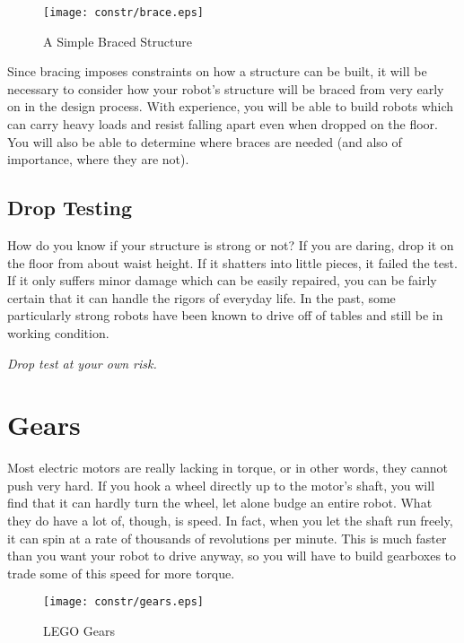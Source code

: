 \begin{figure}[htbp]
\begin{center}
\texttt{[image: constr/brace.eps]}
\caption{A Simple Braced Structure}
\label{brace}
\end{center}
\end{figure}

Since bracing imposes constraints on how a structure can be built, it
will be necessary to consider how your robot's structure will be
braced from very early on in the design process. With experience, you
will be able to build robots which can carry heavy loads and resist
falling apart even when dropped on the floor. You will also be able to
determine where braces are needed (and also of importance, where they
are not).

\subsection{Drop Testing}

How do you know if your structure is strong or not?  If you are
daring, drop it on the floor from about waist height.  If it shatters
into little pieces, it failed the test.  If it only suffers minor
damage which can be easily repaired, you can be fairly certain that it
can handle the rigors of everyday life.  In the past, some
particularly strong robots have been known to drive off of tables and
still be in working condition.

{\it Drop test at your own risk.}

\section{Gears}

Most electric motors are really lacking in torque, or in other words,
they cannot push very hard. If you hook a wheel directly up to the
motor's shaft, you will find that it can hardly turn the wheel, let
alone budge an entire robot. What they do have a lot of, though, is
speed. In fact, when you let the shaft run freely, it can spin at a
rate of thousands of revolutions per minute. This is much faster than
you want your robot to drive anyway, so you will have to build
gearboxes to trade some of this speed for more torque.

\begin{figure}[htbp]
\begin{center}
\texttt{[image: constr/gears.eps]}
\caption{LEGO Gears}
\label{gears}
\end{center}
\end{figure}

